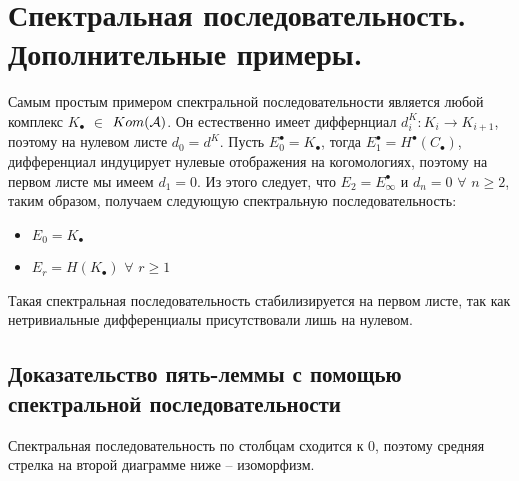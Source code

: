 \documentclass[../main.tex]{subfiles}
\begin{document}
\section{Спектральная последовательность. Дополнительные примеры. }
\begin{to_ex}
Самым простым примером спектральной последовательности является любой комплекс $K_\bullet$ $\in$ $Kom(\mathcal{A})$. Он естественно имеет диффернциал $d_i^{K}\colon K_i \to K_{i+1}$, поэтому на нулевом листе $d_0 = d^K$. Пусть $E^\bullet_0 = K_\bullet$, тогда $E^\bullet_1 = H^\bullet(C_\bullet)$, дифференциал индуцирует нулевые отображения на когомологиях, поэтому на первом листе мы имеем $d_1 = 0$. Из этого следует, что $E_2 = E^\bullet_{\infty}$ и $d_n = 0$ $\forall$ $n\ge 2$, таким образом, получаем следующую спектральную последовательность:
\begin{itemize}
    \item $E_0 = K_\bullet$
    \item  $E_r = H(K_\bullet)$ $\forall$ $r\ge1$
\end{itemize}
Такая спектральная последовательность стабилизируется на первом листе, так как нетривиальные дифференциалы присутствовали лишь на нулевом. 
\end{to_ex}
\subsection{Доказательство пять-леммы с помощью спектральной последовательности}
\begin{to_ex}
Спектральная последовательность по столбцам сходится к $0$, поэтому средняя стрелка на второй диаграмме ниже -- изоморфизм.
\bee
{}
\eee
\bee
{}
\eee
\end{to_ex}
\end{document}
